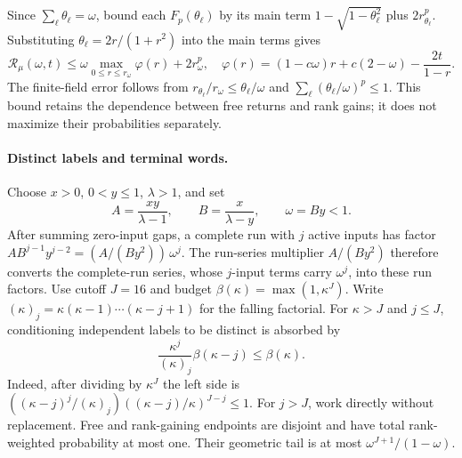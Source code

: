 Since $\sum_\ell\theta_\ell=\omega$, bound each $F_p(\theta_\ell)$ by its
main term $1-\sqrt{1-\theta_\ell^2}$ plus $2r_{\theta_\ell}^p$.
Substituting $\theta_\ell=2r/(1+r^2)$ into the main terms gives
\begin{equation}\label{eq:complete-line-envelope}
 \mathcal R_\mu(\omega,t)\le\omega\max_{0\le r\le r_\omega}\varphi(r)
       +2r_\omega^p,
 \quad
 \varphi(r)=(1-c\omega)r+c(2-\omega)-\frac{2t}{1-r}.
\end{equation}
The finite-field error follows from $r_{\theta_\ell}/r_\omega\le\theta_\ell/\omega$
and $\sum_\ell(\theta_\ell/\omega)^p\le1$. This bound retains the dependence
between free returns and rank gains; it does not maximize their
probabilities separately.

\paragraph{Distinct labels and terminal words.}
Choose $x>0$, $0<y\le1$, $\lambda>1$, and set
\[
 A=\frac{xy}{\lambda-1},\qquad B=\frac{x}{\lambda-y},\qquad \omega=By<1.
\]
After summing zero-input gaps, a complete run with $j$ active
inputs has factor $AB^{j-1}y^{j-2}=(A/(By^2))\,\omega^j$. The
run-series multiplier $A/(By^2)$ therefore converts the complete-run
series, whose $j$-input terms carry $\omega^j$, into these run factors.
Use cutoff $J=16$ and budget $\beta(\kappa)=\max(1,\kappa^J)$. Write
$(\kappa)_j=\kappa(\kappa-1)\cdots(\kappa-j+1)$ for the falling factorial.
For $\kappa>J$ and $j\le J$, conditioning independent labels to be distinct
is absorbed by
\[
 \frac{\kappa^j}{(\kappa)_j}\beta(\kappa-j)\le\beta(\kappa).
\]
Indeed, after dividing by $\kappa^J$ the left side is
$((\kappa-j)^j/(\kappa)_j)((\kappa-j)/\kappa)^{J-j}\le1$.
For $j>J$, work directly without replacement. Free and rank-gaining
endpoints are disjoint and have total rank-weighted probability at most
one. Their geometric tail is at most $\omega^{J+1}/(1-\omega)$.

